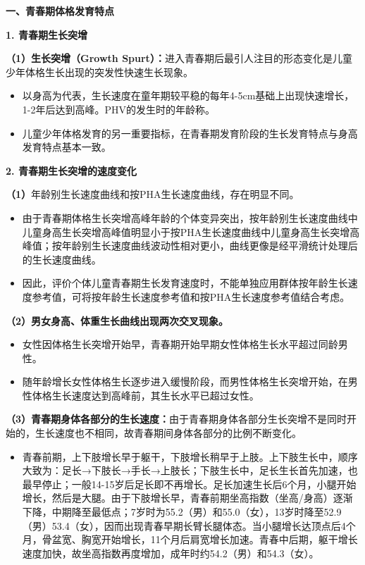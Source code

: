 \begin{keybox}
\textbf{一、青春期体格发育特点}

\textbf{1. 青春期生长突增}

\textbf{（1）生长突增（Growth Spurt）：}进入青春期后最引人注目的形态变化是儿童少年体格生长出现的突发性快速生长现象。

\begin{itemize}[leftmargin=*]
    \item {}以身高为代表，生长速度在童年期较平稳的每年4-5cm基础上出现快速增长，1-2年后达到高峰。PHV的发生时的年龄称。
    \item {}儿童少年体格发育的另一重要指标，在青春期发育阶段的生长发育特点与身高发育特点基本一致。
\end{itemize}

\textbf{2. 青春期生长突增的速度变化}

\textbf{（1）}年龄别生长速度曲线和按PHA生长速度曲线，存在明显不同。
\begin{itemize}[leftmargin=*]
    \item 由于青春期体格生长突增高峰年龄的个体变异突出，按年龄别生长速度曲线中儿童身高生长突增高峰值明显小于按PHA生长速度曲线中儿童身高生长突增高峰值；按年龄别生长速度曲线波动性相对更小，曲线更像是经平滑统计处理后的生长速度曲线。
    \item 因此，评价个体儿童青春期生长发育速度时，不能单独应用群体按年龄生长速度参考值，可将按年龄生长速度参考值和按PHA生长速度参考值结合考虑。
\end{itemize}

\textbf{（2）男女身高、体重生长曲线出现两次交叉现象。}
\begin{itemize}[leftmargin=*]
    \item {}女性因体格生长突增开始早，青春期开始早期女性体格生长水平超过同龄男性。
    \item {}随年龄增长女性体格生长逐步进入缓慢阶段，而男性体格生长突增开始，在男性体格生长速度达到高峰前，其生长水平已超过女性。
\end{itemize}

\textbf{（3）青春期身体各部分的生长速度：}由于青春期身体各部分生长突增不是同时开始的，生长速度也不相同，故青春期间身体各部分的比例不断变化。
\begin{itemize}[leftmargin=*]
    \item 青春前期，上下肢增长早于躯干，下肢增长稍早于上肢。上下肢生长中，顺序大致为：足长→下肢长→手长→上肢长；下肢生长中，足长生长首先加速，也最早停止；一般14-15岁后足长即不再增长。足长加速生长后6个月，小腿开始增长，然后是大腿。由于下肢增长早，青春前期坐高指数（坐高/身高）逐渐下降，中期降至最低点；7岁时为55.2（男）和55.0（女），13岁时降至52.9（男）53.4（女），因而出现青春早期长臂长腿体态。当小腿增长达顶点后4个月，骨盆宽、胸宽开始增长，11个月后肩宽增长加速。青春中后期，躯干增长速度加快，故坐高指数再度增加，成年时约54.2（男）和54.3（女）。
\end{itemize}


\end{keybox}
